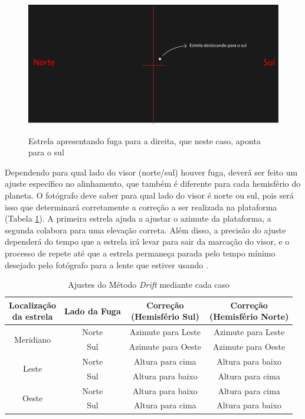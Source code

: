 \begin{figure}[!htb]
	\centering
	\caption{Estrela apresentando fuga para a direita, que neste caso, aponta para o sul}
	\includegraphics[width=0.7\linewidth]{figuras/driftgrelha2}
	\label{fig:driftgrelha2}
\end{figure}

Dependendo para qual lado do visor (norte/sul) houver fuga, deverá ser feito um ajuste específico no alinhamento, que também é diferente para cada hemisfério do planeta. O fotógrafo deve saber para qual lado do visor é norte ou sul, pois será isso que determinará corretamente a correção a ser realizada na plataforma (Tabela \ref{tab:drift}). A primeira estrela ajuda a ajustar o azimute da plataforma, a segunda colabora para uma elevação correta. Além disso, a precisão do ajuste dependerá do tempo que a estrela irá levar para sair da marcação do visor, e o processo de repete até que a estrela permaneça parada pelo tempo mínimo desejado pelo fotógrafo para a lente que estiver usando \cite{book:bbcsky}. 

\begin{table}[!htp]
	\centering
	\caption{Ajustes do Método \textit{Drift} mediante cada caso}
	\label{tab:drift}		
		\begin{tabular}{c|c|c|c}
			\makecell{Localização\\da estrela} & Lado da Fuga & \makecell{Correção\\(Hemisfério Sul)}& \makecell{Correção\\(Hemisfério Norte)}\\  \hline
			\multirow{2}{*}{ Meridiano } & Norte & Azimute para Leste & Azimute para Leste \\ \cline{2-4}
			& Sul & Azimute para Oeste & Azimute para Oeste \\ \hline
			\multirow{2}{*}{ Leste } & Norte & Altura para cima & Altura para baixo \\ \cline{2-4}
			& Sul & Altura para baixo & Altura para cima \\ \hline
			\multirow{2}{*}{ Oeste } & Norte & Altura para baixo & Altura para cima \\ \cline{2-4}
			& Sul & Altura para cima & Altura para baixo \\ 
		\end{tabular}
	
\end{table}


